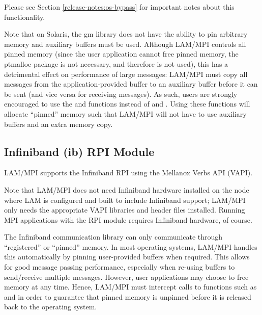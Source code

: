 
Please see Section \ref{release-notes:os-bypass} for important notes
about this functionality.


Note that on Solaris, the gm library does not have the ability to pin
arbitrary memory and auxiliary buffers must be used.  Although LAM/MPI
controls all pinned memory (since the user application cannot free
pinned memory, the ptmalloc package is not necessary, and therefore is
not used), this has a detrimental effect on performance of large
messages: LAM/MPI must copy all messages from the application-provided
buffer to an auxiliary buffer before it can be sent (and vice versa
for receiving messages).  As such, users are strongly encouraged to
use the  and 
functions instead of  and .  Using these
functions will allocate ``pinned'' memory such that LAM/MPI will not
have to use auxiliary buffers and an extra memory copy.


\subsection{Infiniband (ib) RPI Module}
\label{sec:requirements-ib}


LAM/MPI supports the Infiniband RPI using the Mellanox Verbs API
(VAPI).

Note that LAM/MPI does not need Infiniband hardware installed on the
node where LAM is configured and built to include Infiniband support;
LAM/MPI only needs the appropriate VAPI libraries and header files
installed.  Running MPI applications with the  RPI module
requires Infiniband hardware, of course.

The Infiniband communication library can only communicate
through ``registered'' or ``pinned'' memory.  In most operating
systems, LAM/MPI handles this automatically by pinning user-provided
buffers when required.  This allows for good message passing
performance, especially when re-using buffers to send/receive multiple
messages.  However, user applications may choose to free memory at any
time.  Hence, LAM/MPI must intercept calls to functions such as
 and  in order to guarantee that pinned
memory is unpinned before it is released back to the operating system.

